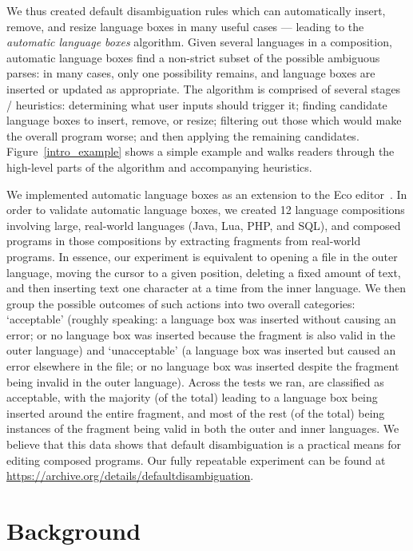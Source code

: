 \documentclass[sigplan,screen]{acmart}
\begin{document}
We thus created default disambiguation rules which can
automatically insert, remove, and resize language boxes in many useful cases
--- leading to the \emph{automatic language boxes} algorithm.
Given several languages in
a composition, automatic language boxes find a non-strict subset of the
possible ambiguous parses: in many cases, only one possibility remains, and
language boxes are inserted or updated as appropriate. The
algorithm is comprised of several stages / heuristics: determining what user
inputs should trigger it; finding candidate language boxes to insert, remove,
or resize; filtering out those which would make the overall program worse; and
then applying the remaining candidates. Figure~\ref{intro_example} shows a
simple example and walks readers through the high-level parts of the algorithm
and accompanying heuristics.

We implemented automatic language boxes as an extension to the Eco
editor~\cite{diekmann14eco}. In order to validate automatic language boxes, we
created 12 language compositions involving large, real-world languages
(Java, Lua, PHP, and SQL),
and composed programs in those compositions by extracting fragments from real-world programs.
In essence, our experiment is equivalent to opening a file
in the outer language, moving the cursor to a given position, deleting a fixed amount
of text, and then inserting text one character at a time from the inner language.
We then group the possible outcomes of such actions into two overall categories: `acceptable' (roughly
speaking: a language box was inserted without causing an error; or no language
box was inserted because the fragment is also valid in the outer language) and
`unacceptable' (a language box was inserted but caused an error elsewhere in
the file; or no language box was inserted despite the fragment being invalid in
the outer language). Across the \totalinsertions tests we ran, \validalloverall are
classified as acceptable, with the majority
(\breakdownallvalidsame of the total) leading to a language box being inserted
around the entire fragment, and most of the rest (\breakdownallnovalid of the total)
being instances of the fragment being valid in both the outer and inner
languages. We believe that this data shows that default disambiguation is
a practical means for editing composed programs. Our fully
repeatable experiment can be found at \url{https://archive.org/details/defaultdisambiguation}.


\section{Background}
\label{sec_background}
\end{document}
